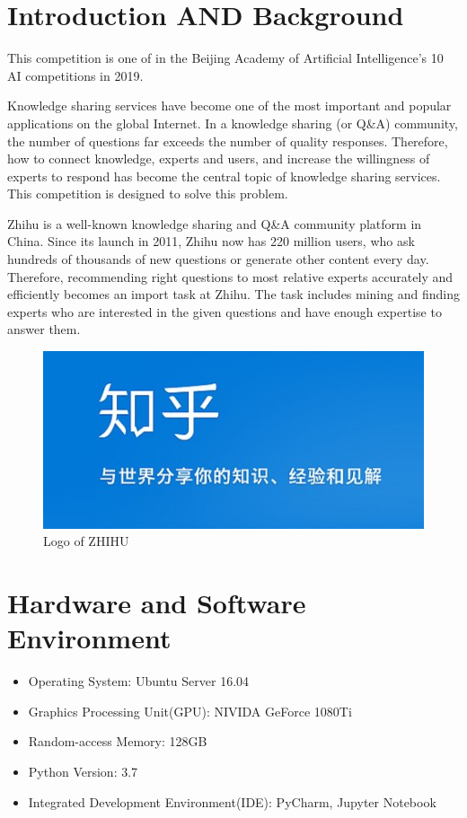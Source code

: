 \documentclass[sigconf]{acmart}
\begin{document}
\maketitle

\section{Introduction AND Background}
This competition is one of in the Beijing Academy of Artificial Intelligence’s 10 AI competitions in 2019.

 
Knowledge sharing services have become one of the most important and popular applications on the global Internet. In a knowledge sharing (or Q\&A) community, the number of questions far exceeds the number of quality responses. Therefore, how to connect knowledge, experts and users, and increase the willingness of experts to respond has become the central topic of knowledge sharing services. This competition is designed to solve this problem.

Zhihu is a well-known knowledge sharing and Q\&A community platform in China. Since its launch in 2011, Zhihu now has 220 million users, who ask hundreds of thousands of new questions or generate other content every day. Therefore, recommending right questions to most relative experts accurately and efficiently becomes an import task at Zhihu. The task includes mining and finding experts who are interested in the given questions and have enough expertise to answer them.
\begin{figure}[H]
  \centering
  \includegraphics[width=.5\linewidth]{1.jpg}
  \caption{Logo of ZHIHU}
\end{figure}
\section{Hardware and Software Environment}


\begin{itemize}
\item Operating System: Ubuntu Server 16.04
\item Graphics Processing Unit(GPU): NIVIDA GeForce 1080Ti
\item Random-access Memory: 128GB
\item Python Version: 3.7
\item Integrated Development Environment(IDE): PyCharm, Jupyter Notebook


\end{itemize}
\end{document}

